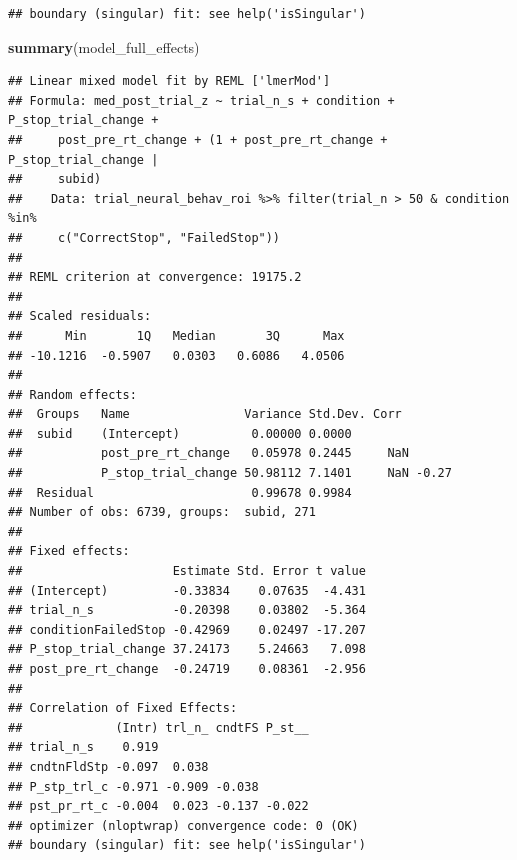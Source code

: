 \documentclass[
]{article}
\newenvironment{Shaded}{\begin{snugshade}}{\end{snugshade}}
\newcommand{\DecValTok}[1]{\textcolor[rgb]{0.00,0.00,0.81}{#1}}
\newcommand{\KeywordTok}[1]{\textcolor[rgb]{0.13,0.29,0.53}{\textbf{#1}}}
\newcommand{\NormalTok}[1]{#1}
\newcommand{\OperatorTok}[1]{\textcolor[rgb]{0.81,0.36,0.00}{\textbf{#1}}}
\newcommand{\StringTok}[1]{\textcolor[rgb]{0.31,0.60,0.02}{#1}}
\begin{document}
\begin{verbatim}
## boundary (singular) fit: see help('isSingular')
\end{verbatim}

\begin{Shaded}
\begin{Highlighting}[]
\KeywordTok{summary}\NormalTok{(model_full_effects)}
\end{Highlighting}
\end{Shaded}

\begin{verbatim}
## Linear mixed model fit by REML ['lmerMod']
## Formula: med_post_trial_z ~ trial_n_s + condition + P_stop_trial_change +  
##     post_pre_rt_change + (1 + post_pre_rt_change + P_stop_trial_change |  
##     subid)
##    Data: trial_neural_behav_roi %>% filter(trial_n > 50 & condition %in%  
##     c("CorrectStop", "FailedStop"))
## 
## REML criterion at convergence: 19175.2
## 
## Scaled residuals: 
##      Min       1Q   Median       3Q      Max 
## -10.1216  -0.5907   0.0303   0.6086   4.0506 
## 
## Random effects:
##  Groups   Name                Variance Std.Dev. Corr       
##  subid    (Intercept)          0.00000 0.0000              
##           post_pre_rt_change   0.05978 0.2445     NaN      
##           P_stop_trial_change 50.98112 7.1401     NaN -0.27
##  Residual                      0.99678 0.9984              
## Number of obs: 6739, groups:  subid, 271
## 
## Fixed effects:
##                     Estimate Std. Error t value
## (Intercept)         -0.33834    0.07635  -4.431
## trial_n_s           -0.20398    0.03802  -5.364
## conditionFailedStop -0.42969    0.02497 -17.207
## P_stop_trial_change 37.24173    5.24663   7.098
## post_pre_rt_change  -0.24719    0.08361  -2.956
## 
## Correlation of Fixed Effects:
##             (Intr) trl_n_ cndtFS P_st__
## trial_n_s    0.919                     
## cndtnFldStp -0.097  0.038              
## P_stp_trl_c -0.971 -0.909 -0.038       
## pst_pr_rt_c -0.004  0.023 -0.137 -0.022
## optimizer (nloptwrap) convergence code: 0 (OK)
## boundary (singular) fit: see help('isSingular')
\end{verbatim}

\begin{Shaded}
\end{Shaded}
\end{document}
